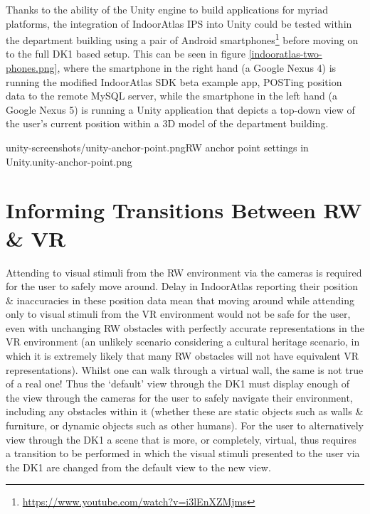Thanks to the ability of the Unity engine to build applications for myriad platforms, the integration of IndoorAtlas IPS into Unity could be tested within the department building using a pair of Android smartphones\footnote{\url{https://www.youtube.com/watch?v=i3lEnXZMjms}} before moving on to the full DK1 based setup. This can be seen in figure \ref{indooratlas-two-phones.png}, where the smartphone in the right hand (a Google Nexus 4) is running the modified IndoorAtlas SDK beta example app, POSTing position data to the remote MySQL server, while the smartphone in the left hand (a Google Nexus 5) is running a Unity application that depicts a top-down view of the user's current position within a 3D model of the department building.

       {unity-screenshots/unity-anchor-point.png}{RW anchor point settings in Unity.}{unity-anchor-point.png}


\section{Informing Transitions Between RW \& VR}
Attending to visual stimuli from the RW environment via the cameras is required for the user to safely move around. Delay in IndoorAtlas reporting their position \& inaccuracies in these position data mean that moving around while attending only to visual stimuli from the VR environment would not be safe for the user, even with unchanging RW obstacles with perfectly accurate representations in the VR environment (an unlikely scenario considering a cultural heritage scenario, in which it is extremely likely that many RW obstacles will not have equivalent VR representations). Whilst one can walk through a virtual wall, the same is not true of a real one! Thus the `default' view through the DK1 must display enough of the view through the cameras for the user to safely navigate their environment, including any obstacles within it (whether these are static objects such as walls \& furniture, or dynamic objects such as other humans). For the user to alternatively view through the DK1 a scene that is more, or completely, virtual, thus requires a transition to be performed in which the visual stimuli presented to the user via the DK1 are changed from the default view to the new view.

